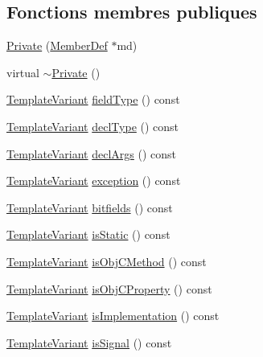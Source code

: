 \subsection*{Fonctions membres publiques}
\begin{DoxyCompactItemize}
\item 
\hyperlink{class_member_context_1_1_private_af9f52e1872b63f5ac532c5e99fac96fa}{Private} (\hyperlink{class_member_def}{Member\+Def} $\ast$md)
\item 
virtual \hyperlink{class_member_context_1_1_private_a4db9777c2b01c167c16649f5c2efe6b7}{$\sim$\+Private} ()
\item 
\hyperlink{class_template_variant}{Template\+Variant} \hyperlink{class_member_context_1_1_private_af978a282a4d08cae8323010212a476d4}{field\+Type} () const 
\item 
\hyperlink{class_template_variant}{Template\+Variant} \hyperlink{class_member_context_1_1_private_a83ddc6ac652f13b6fff07e279dc84aa8}{decl\+Type} () const 
\item 
\hyperlink{class_template_variant}{Template\+Variant} \hyperlink{class_member_context_1_1_private_af9d4bd94348c4f3315d2743a4f885255}{decl\+Args} () const 
\item 
\hyperlink{class_template_variant}{Template\+Variant} \hyperlink{class_member_context_1_1_private_a5c11fa400463db08585672a38be5860c}{exception} () const 
\item 
\hyperlink{class_template_variant}{Template\+Variant} \hyperlink{class_member_context_1_1_private_a677c1886ea95d29f054183a57ba83f24}{bitfields} () const 
\item 
\hyperlink{class_template_variant}{Template\+Variant} \hyperlink{class_member_context_1_1_private_a532fa3ef3dd1d86090a0876835065fc1}{is\+Static} () const 
\item 
\hyperlink{class_template_variant}{Template\+Variant} \hyperlink{class_member_context_1_1_private_af50c235a3d71b730c2f5fc1254b4db09}{is\+Obj\+C\+Method} () const 
\item 
\hyperlink{class_template_variant}{Template\+Variant} \hyperlink{class_member_context_1_1_private_ad6ec1569d8a791a161911581ba8399ac}{is\+Obj\+C\+Property} () const 
\item 
\hyperlink{class_template_variant}{Template\+Variant} \hyperlink{class_member_context_1_1_private_ab5c14d356e0fe06d5bb22591efc53303}{is\+Implementation} () const 
\item 
\hyperlink{class_template_variant}{Template\+Variant} \hyperlink{class_member_context_1_1_private_ab0a9237328be739ff00542e2b8645ba1}{is\+Signal} () const 

\end{DoxyCompactItemize}
